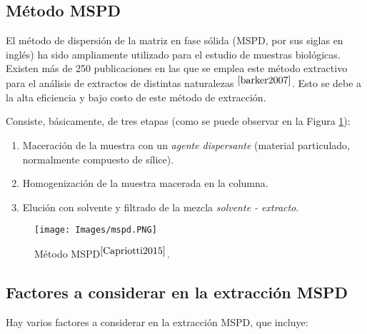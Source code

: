 \begin{center}
	\section{M\'etodo MSPD}	\label{MSPD_chap}
\end{center}

\noindent
\justify

El m\'etodo de dispersi\'on de la matriz en fase s\'olida (MSPD, por sus siglas en ingl\'es) ha sido ampliamente utilizado para el estudio de muestras biol\'ogicas. Existen m\'as de 250 publicaciones en las que se emplea este m\'etodo extractivo para el an\'alisis de extractos de distintas naturalezas $^{\cite{barker2007}}$. Esto se debe a la alta eficiencia y bajo costo de este m\'etodo de extracci\'on. 

\noindent
\justify

Consiste, b\'asicamente, de tres etapas (como se puede observar en la Figura \ref{mspd}):

\begin{enumerate}
	\item Maceraci\'on de la muestra con un \textit{agente dispersante} (material particulado, normalmente compuesto de s\'ilice).
	\item Homogenizaci\'on de la muestra macerada en la columna.
	\item Eluci\'on con solvente y filtrado de la mezcla \textit{solvente - extracto}.
\end{enumerate}

\begin{figure}[h!]
\centering
\texttt{[image: Images/mspd.PNG]}
\caption{M\'etodo MSPD$^{\cite{Capriotti2015}}$.}
\label{mspd}
\end{figure}

\subsection{Factores a considerar en la extracci\'on MSPD}

\noindent
\justify

Hay varios factores a considerar en la extracci\'on MSPD, que incluye:

